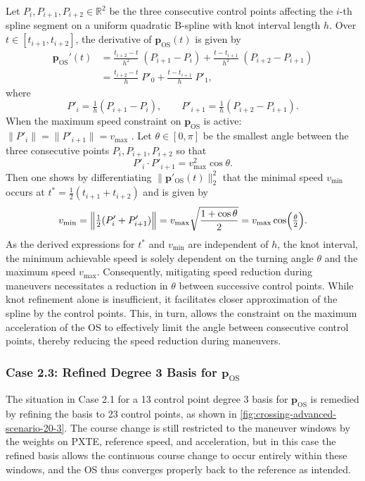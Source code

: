 Let $P_i,P_{i+1},P_{i+2}\in\mathbb R^2$ be the three consecutive control points affecting the $i$-th spline segment on a uniform quadratic B-spline with knot interval length $h$.  Over $t\in[t_{i+1}, t_{i+2}]$, the derivative of $\mathbf p_\text{OS}(t)$ is given by
\begin{equation}
    \begin{aligned}
        \mathbf p_\text{OS}'(t) 
        &=\frac{t_{i+2}-t}{h^2}\;(P_{i+1}-P_i) 
        +\frac{t - t_{i+1}}{h^2}\;(P_{i+2}-P_{i+1})\\
        &=\frac{t_{i+2}-t}{h}\;P'_0
        +\frac{t - t_{i+1}}{h}\;P'_1,
    \end{aligned}
\end{equation}
where
\begin{equation}
P'_i = \tfrac1h (P_{i+1} - P_i),
\qquad
P'_{i+1} = \tfrac1h(P_{i+2} - P_{i+1}).
\end{equation}
When the maximum speed constraint on $\mathbf p_\text{OS}$ is active: $\|P'_i\|=\|P'_{i+1}\|=v_{\max}$ .  Let $\theta\in[0,\pi]$ be the smallest angle between the three consecutive points $P_i,P_{i+1},P_{i+2}$ so that
\begin{equation}
P'_i\cdot P'_{i+1} = v_{\max}^2\cos\theta.
\end{equation}
Then one shows by differentiating $\|\mathbf p'_\text{OS}(t)\|_2^2$ that the minimal speed $v_{\min}$ occurs at $t^*=\tfrac12(t_{i+1}+t_{i+2})$ and is given by
\begin{equation}
v_{\min}
=\Bigl\|\tfrac12(P'_i+P'_{i+1})\Bigr\|
=v_{\max}\sqrt{\frac{1+\cos\theta}{2}}
=v_{\max}\cos\Bigl(\tfrac\theta2\Bigr).
\end{equation}
As the derived expressions for $t^*$ and $v_{\min}$ are independent of $h$, the knot interval, the minimum achievable speed is solely dependent on the turning angle $\theta$ and the maximum speed $v_{\max}$. Consequently, mitigating speed reduction during maneuvers necessitates a reduction in $\theta$ between successive control points. While knot refinement alone is insufficient, it facilitates closer approximation of the spline by the control points. This, in turn, allows the constraint on the maximum acceleration of the OS to effectively limit the angle between consecutive control points, thereby reducing the speed reduction during maneuvers.


\subsubsection{Case 2.3: Refined Degree 3 Basis for $\mathbf p_\text{OS}$}
The situation in Case 2.1 for a 13 control point degree 3 basis for $\mathbf p_\text{OS}$ is remedied by refining the basis to 23 control points, as shown in \cref{fig:crossing-advanced-scenario-20-3}. The course change is still restricted to the maneuver windows by the weights on PXTE, reference speed, and acceleration, but in this case the refined basis allows the continuous course change to occur entirely within these windows, and the OS thus converges properly back to the reference as intended.


